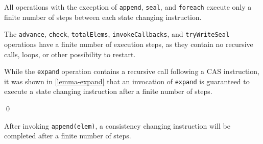 
\begin{lemmatwo}\label{lemma-finite-steps-state-change}
All operations with the exception of \verb=append=, \verb=seal=, and
\verb=foreach= execute only a finite number of steps between each state
changing instruction.
\end{lemmatwo}

\begin{prooftwo} The \verb=advance=, \verb=check=, \verb=totalElems=,
\verb=invokeCallbacks=, and \verb=tryWriteSeal= operations have a finite
number of execution steps, as they contain no recursive calls, loops, or other
possibility to restart.

While the \verb=expand= operation contains a recursive call following a CAS
instruction, it was shown in \ref{lemma-expand} that an invocation of
\verb=expand= is guaranteed to execute a state changing instruction after a
finite number of steps.

\qed
\end{prooftwo}


\begin{lemmatwo}[Append]\label{lemma-append}
After invoking \verb=append(elem)=, a consistency changing instruction will be
completed after a finite number of steps.
\end{lemmatwo}

